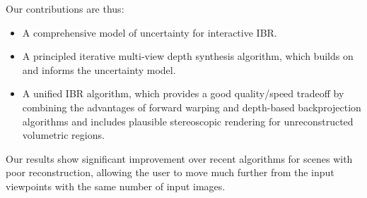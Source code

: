 Our contributions are thus:
\begin{itemize}
\item A comprehensive model of uncertainty for interactive IBR.
\item A principled iterative multi-view depth synthesis algorithm, which builds on and informs the uncertainty model.
\item A unified IBR algorithm, which provides a good quality/speed tradeoff by combining the advantages of forward warping and depth-based backprojection algorithms and includes plausible stereoscopic rendering for unreconstructed volumetric regions.
\end{itemize}
Our results show significant improvement over recent algorithms for scenes with poor reconstruction,
allowing the user to move much further from the input viewpoints with the same number of input images.

